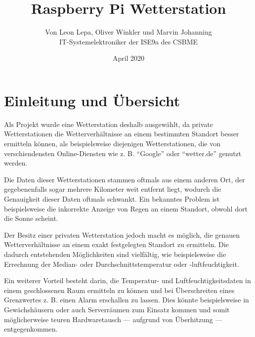 \documentclass[a4paper,12pt]{article}
\begin{document}
\title{\textbf{Raspberry Pi Wetterstation}}
\author{Von Leon Lepa, Oliver Winkler und Marvin Johanning\\IT-Systemelektroniker der ISE9a des CSBME}
\date{April 2020}
\maketitle
{}
\pagebreak

\tableofcontents
\pagebreak

\setlength{\headheight}{15.2pt}
\pagestyle{fancy}
\renewcommand{\headrulewidth}{2pt}
\renewcommand{\footrulewidth}{2pt}
\fancyhead[R]{\nouppercase\leftmark}

\section{Einleitung und Übersicht}
Als Projekt wurde eine Wetterstation deshalb ausgewählt, da private Wetterstationen die Wetterverhältnisse an einem bestimmten Standort besser ermitteln können, als beispielsweise diejenigen Wetterstationen, die von verschiendensten Online-Diensten wie z. B. "`Google"' oder "`wetter.de"' genutzt werden.

Die Daten dieser Wetterstationen stammen oftmals aus einem anderen Ort, der gegebenenfalls sogar mehrere Kilometer weit entfernt liegt, wodurch die Genauigkeit dieser Daten oftmals schwankt. Ein bekanntes Problem ist beispielsweise die inkorrekte Anzeige von Regen an einem Standort, obwohl dort die Sonne scheint.

Der Besitz einer privaten Wetterstation jedoch macht es möglich, die genauen Wetterverhältnisse an einem exakt festgelegten Standort zu ermitteln. Die dadurch entstehenden Möglichkeiten sind vielfältig, wie beispielsweise die Errechnung der Median- oder Durchschnittstemperatur oder -luftfeuchtigkeit.

Ein weiterer Vorteil besteht darin, die Temperatur- und Luftfeuchtigkeitsdaten in einem geschlossenen Raum ermitteln zu können und bei Überschreiten eines Grenzwertes z. B. einen Alarm erschallen zu lassen. Dies könnte beispielsweise in Gewächshäusern oder auch Serverräumen zum Einsatz kommen und somit möglicherweise teuren Hardwaretausch — aufgrund von Überhitzung — entgegenkommen.
\end{document}
